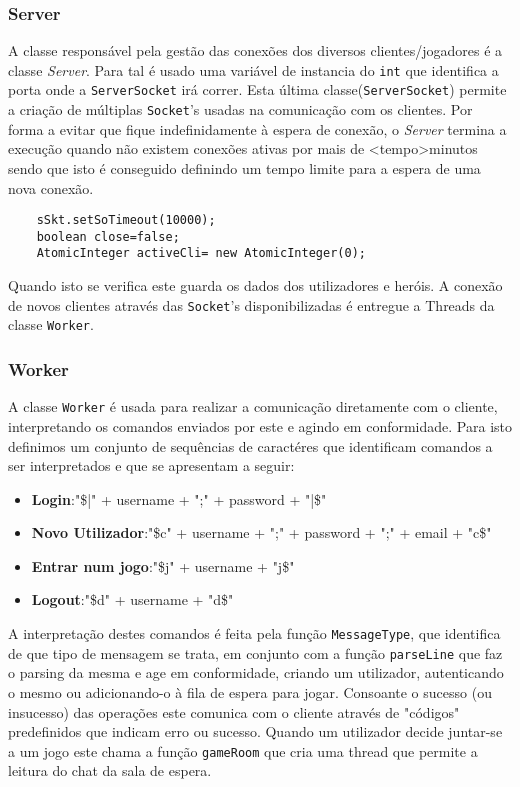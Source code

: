 \documentclass{article}
\begin{document}
\subsubsection{Server}
A classe responsável pela gestão das conexões dos diversos clientes/jogadores é a classe \textit{Server}.
Para tal é usado uma variável de instancia do \texttt{int} que identifica a porta onde a \texttt{ServerSocket} irá correr. Esta última classe(\texttt{ServerSocket}) permite a criação de múltiplas \texttt{Socket}'s usadas na comunicação com os clientes.
Por forma a evitar que fique indefinidamente à espera de conexão, o \textit{Server} termina a execução quando não existem conexões ativas por mais de <tempo>minutos sendo que isto é conseguido definindo um tempo limite para a espera de uma nova conexão.
\begin{verbatim}
    sSkt.setSoTimeout(10000);
    boolean close=false;
    AtomicInteger activeCli= new AtomicInteger(0);
\end{verbatim}

Quando isto se verifica este guarda os dados dos utilizadores e heróis.
A conexão de novos clientes através das \texttt{Socket}'s disponibilizadas é entregue a Threads da classe \texttt{Worker}.


\subsubsection{Worker}
A classe \texttt{Worker} é usada para realizar a comunicação diretamente com o cliente, interpretando os comandos enviados por este e agindo em conformidade.
Para isto definimos um conjunto de sequências de caractéres que identificam comandos a ser interpretados e que se apresentam a seguir:
\begin{itemize}
    \item \textbf{Login}:"\$|" + username + ";" + password + "|\$" 
    \item \textbf{Novo Utilizador}:"\$c" + username + ";" + password + ";" + email + "c\$" 
    \item \textbf{Entrar num jogo}:"\$j" + username + "j\$" 
    \item \textbf{Logout}:"\$d" + username + "d\$" 
\end{itemize}
A interpretação destes comandos é feita pela função \texttt{MessageType}, que identifica de que tipo de mensagem se trata, em conjunto com a função \texttt{parseLine} que faz o parsing da mesma e age em conformidade, criando um utilizador, autenticando o mesmo ou adicionando-o à fila de espera para jogar. Consoante o sucesso (ou insucesso) das operações este comunica com o cliente através de "códigos" predefinidos que indicam erro ou sucesso.
Quando um utilizador decide juntar-se a um jogo este chama a função \texttt{gameRoom} que cria uma thread que permite a leitura do chat da sala de espera.
\end{document}
